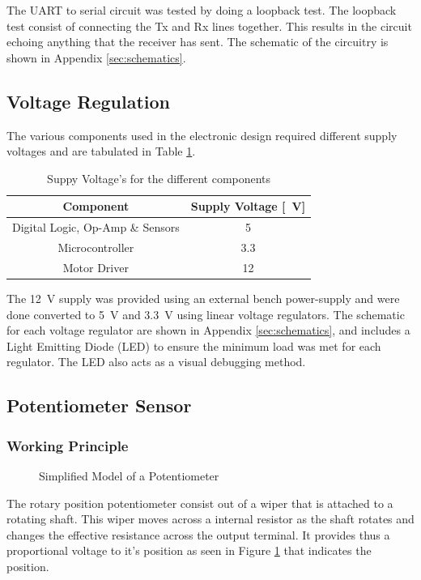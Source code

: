 The UART to serial circuit was tested by doing a loopback test. The loopback test consist of connecting the Tx and Rx lines together. This results in the circuit echoing anything that the receiver has sent. The schematic of the circuitry is shown in Appendix \ref{sec:schematics}.


\subsection{Voltage Regulation}

The various components used in the electronic design required different supply voltages and are tabulated in Table \ref{table:supplyVoltage}.\\


\begin{table}[]
	\centering
	\begin{tabular}{|c|c|}
		\hline
		Component & Supply Voltage [\SI{}{V}] \\
		\hline
		\hline
		Digital Logic, Op-Amp \& Sensors & \SI{5}{} \\
		\hline
		Microcontroller & \SI{3.3}{} \\
		\hline
		Motor Driver & \SI{12}{} \\
		\hline
	\end{tabular}
	\caption{Suppy Voltage's for the different components}
	\label{table:supplyVoltage}
\end{table}

The \SI{12}{\volt} supply was provided using an external bench power-supply and were done converted to \SI{5}{V} and \SI{3.3}{V} using linear voltage regulators. The schematic for each voltage regulator are shown in Appendix \ref{sec:schematics}, and includes a Light Emitting Diode (LED) to ensure the minimum load was met for each regulator. The LED also acts as a visual debugging method.

\subsection{Potentiometer Sensor}
\subsubsection{Working Principle}
\begin{figure}[h]
	\centering
	
	\caption{Simplified Model of a Potentiometer}
	\label{fig:potentiometer}
\end{figure}
The rotary position potentiometer consist out of a wiper that is attached to a rotating shaft. This wiper moves across a internal resistor as the shaft rotates and changes the effective resistance across the output terminal. It provides thus a proportional voltage to it's position as seen in Figure \ref{fig:potentiometer} that indicates the position.

